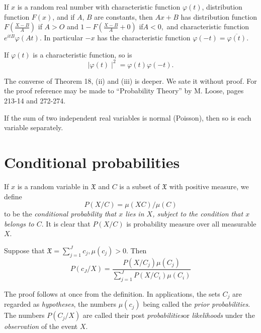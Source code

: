 \begin{theorem}\label{chap2:sec7:thm19}  %
  If $x$ is a random real number with characteristic function
  $\varphi(t)$, distribution function $F(x)$, and if $A$, $B$ are constants,
  then $Ax+B$ has distribution function $F(\frac{X-B}{A})$ if $A > O$ and
  $1-F(\frac{X-B}{A}+0)$ 
  if\pageoriginale $A < 0,$ and characteristic function $e^{itB} \varphi(At)$. In
  particular $-x$ has the characteristic function
  $\varphi(-t)=\overline{\varphi(t)}$.  
\end{theorem}

\begin{coro*}
If $\varphi(t)$ is a characteristic function, so is 
    $$ 
    \mid \varphi (t) \mid^2 =\varphi(t) \varphi(-t).
    $$

The converse of Theorem 18, (ii) and (iii) is deeper. We sate it
without proof. For the proof reference may be made to ``Probability
Theory'' by M. Loose, pages 213-14 and 272-274. 
\end{coro*}

\begin{theorem}\label{chap2:sec7:thm20}  %
  If the sum of two independent real variables is normal (Poisson), then
  so is each variable separately. 
\end{theorem}

\section{{Conditional probabilities}}\label{chap2:sec8} 

If $x$ is a random variable in $\mathfrak{X}$ and $C$ is a subset of
$\mathfrak{X}$ with positive measure, we define 
$$
P(X/C)= \mu (XC) / \mu (C)
$$
to be the \textit{conditional probability that $x$ lies in $X$, subject to the
condition that $x$ belongs to $C$}. It is clear that $P(X/C)$ is probability
measure over all measurable $X$. 

\begin{theorem}\label{chap2:sec8:thm21}  %
  Suppose that $\mathfrak{X}= \sum\limits_{j=1}^J c_j, \mu (c_j)>0$. Then    
  $$
  P(c_J/X) = \frac{P(X/C_j) \mu (C_j)}{{\sum\limits^{J}_{j=1}
      P(X/C_i) \mu (C_i)}}
  $$
  
  The proof follows at once from the definition. In applications, the
  sets $C_j$ are regarded as \textit{hypotheses}, the numbers $\mu (c_j)$ being
  called the \textit{prior probabilities}. The numbers $P(C_j/X)$ are
  called their post  
  \textit{probabilities}\pageoriginale or \textit{likelihoods} under the
  \textit{observation} of the event $X$. 
\end{theorem}

